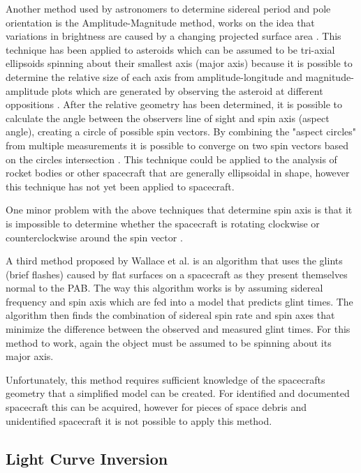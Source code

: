 \documentclass{article}
\begin{document}
Another method used by astronomers to determine sidereal period and pole orientation is the Amplitude-Magnitude method, works on the idea that variations in brightness are caused by a changing projected surface area \cite{Magnusson1989DeterminationOP}. This technique has been applied to asteroids which can be assumed to be tri-axial ellipsoids spinning about their smallest axis (major axis) because it is possible to determine the relative size of each axis from amplitude-longitude and magnitude-amplitude plots which are generated by observing the asteroid at different oppositions \cite{Magnusson1989DeterminationOP}. After the relative geometry has been determined, it is possible to calculate the angle between the observers line of sight and spin axis (aspect angle), creating a circle of possible spin vectors. By combining the "aspect circles" from multiple measurements it is possible to converge on two spin vectors based on the circles intersection \cite{Magnusson1989DeterminationOP}. This technique could be applied to the analysis of rocket bodies or other spacecraft that are generally ellipsoidal in shape, however this technique has not yet been applied to spacecraft.

One minor problem with the above techniques that determine spin axis is that it is impossible to determine whether the spacecraft is rotating clockwise or counterclockwise around the spin vector \cite{Magnusson1989DeterminationOP}.

A third method proposed by Wallace et al. \cite{Wallace} is an algorithm that uses the glints (brief flashes) caused by flat surfaces on a spacecraft as they present themselves normal to the PAB. The way this algorithm works is by assuming sidereal frequency and spin axis which are fed into a model that predicts glint times. The algorithm then finds the combination of sidereal spin rate and spin axes that minimize the difference between the observed and measured glint times. For this method to work, again the object must be assumed to be spinning about its major axis.

Unfortunately, this method requires sufficient knowledge of the spacecrafts geometry that a simplified model can be created. For identified and documented spacecraft this can be acquired, however for pieces of space debris and unidentified spacecraft it is not possible to apply this method.

\subsection{Light Curve Inversion}
\end{document}
